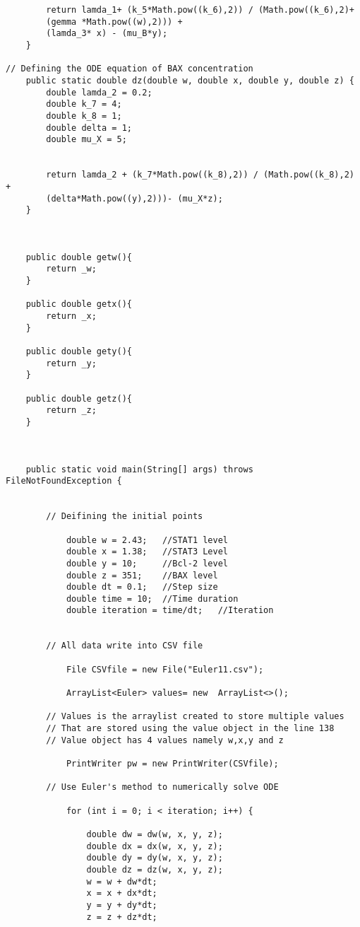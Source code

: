 \begin{framed}
\begin{verbatim}
        return lamda_1+ (k_5*Math.pow((k_6),2)) / (Math.pow((k_6),2)+ 
        (gemma *Math.pow((w),2))) + 
        (lamda_3* x) - (mu_B*y);
    }

// Defining the ODE equation of BAX concentration     
    public static double dz(double w, double x, double y, double z) {
        double lamda_2 = 0.2;
        double k_7 = 4;
        double k_8 = 1;
        double delta = 1;
        double mu_X = 5;
        

        return lamda_2 + (k_7*Math.pow((k_8),2)) / (Math.pow((k_8),2) + 
        (delta*Math.pow((y),2)))- (mu_X*z);
    }



    public double getw(){
        return _w;
    }

    public double getx(){
        return _x;
    }
    
    public double gety(){
        return _y;
    }
    
    public double getz(){
        return _z;
    }
    


    public static void main(String[] args) throws FileNotFoundException {


        // Deifining the initial points 

            double w = 2.43;   //STAT1 level
            double x = 1.38;   //STAT3 Level
            double y = 10;     //Bcl-2 level
            double z = 351;    //BAX level
            double dt = 0.1;   //Step size
            double time = 10;  //Time duration
            double iteration = time/dt;   //Iteration


        // All data write into CSV file    
    
            File CSVfile = new File("Euler11.csv");
    
            ArrayList<Euler> values= new  ArrayList<>();

        // Values is the arraylist created to store multiple values 
        // That are stored using the value object in the line 138
        // Value object has 4 values namely w,x,y and z

            PrintWriter pw = new PrintWriter(CSVfile);

        // Use Euler's method to numerically solve ODE

            for (int i = 0; i < iteration; i++) {
    
                double dw = dw(w, x, y, z);
                double dx = dx(w, x, y, z);
                double dy = dy(w, x, y, z); 
                double dz = dz(w, x, y, z);
                w = w + dw*dt;
                x = x + dx*dt;
                y = y + dy*dt;
                z = z + dz*dt;
            

\end{verbatim}
\end{framed}
